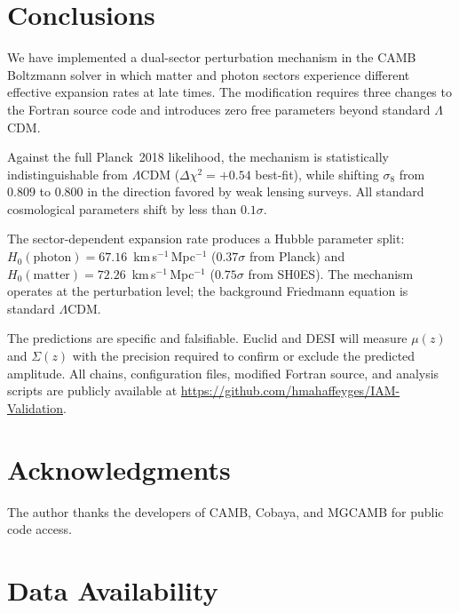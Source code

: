 \documentclass[11pt]{article}
\begin{document}
\section{Conclusions}
\label{sec:conclusions}

We have implemented a dual-sector perturbation mechanism in the CAMB
Boltzmann solver in which matter and photon sectors experience
different effective expansion rates at late times.  The modification
requires three changes to the Fortran source code and introduces zero
free parameters beyond standard $\Lambda$CDM.

Against the full Planck~2018 likelihood, the mechanism is statistically
indistinguishable from $\Lambda$CDM ($\Delta\chi^2 = +0.54$ best-fit),
while shifting $\sigma_8$ from $0.809$ to $0.800$ in the direction
favored by weak lensing surveys.  All standard cosmological parameters
shift by less than $0.1\sigma$.

The sector-dependent expansion rate produces a Hubble parameter split:
$H_0(\mathrm{photon}) = 67.16$~km\,s$^{-1}$\,Mpc$^{-1}$
($0.37\sigma$ from Planck) and
$H_0(\mathrm{matter}) = 72.26$~km\,s$^{-1}$\,Mpc$^{-1}$
($0.75\sigma$ from SH0ES).  The mechanism operates at the perturbation
level; the background Friedmann equation is standard $\Lambda$CDM.

The predictions are specific and falsifiable.  Euclid and DESI will
measure $\mu(z)$ and $\Sigma(z)$ with the precision required to
confirm or exclude the predicted amplitude.  All chains, configuration
files, modified Fortran source, and analysis scripts are publicly
available at
\url{https://github.com/hmahaffeyges/IAM-Validation}.


\section*{Acknowledgments}

The author thanks the developers of CAMB, Cobaya, and MGCAMB for
public code access.


\section*{Data Availability}
\end{document}
